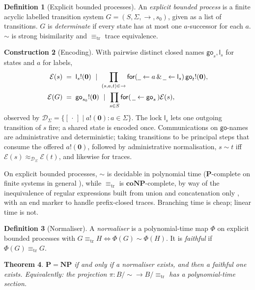 \documentclass[11pt]{article}
\theoremstyle{definition}
\newtheorem{definition}{Definition}[section]
\newtheorem{construction}[definition]{Construction}
\theoremstyle{plain}
\newtheorem{theorem}[definition]{Theorem}
\theoremstyle{remark}
\newcommand{\inp}[3]{\mathsf{for}(\,#1 \leftarrow #2\,)#3}
\newcommand{\out}[2]{#1!(#2)}
\newcommand{\nil}{\mathbf{0}}
\newcommand{\Obs}{\mathcal{D}}
\newcommand{\bisim}{\approx}
\newcommand{\sbisim}{\sim}
\newcommand{\treq}{\equiv_{\mathrm{tr}}}
\newcommand{\wild}{\mathord{\underline{\hspace{0.5em}}}}
\newcommand{\hole}{[\,\cdot\,]}
\newcommand{\go}{\mathsf{go}}
\newcommand{\lk}{\mathsf{l}}
\newcommand{\Pclass}{\mathbf{P}}
\newcommand{\NPclass}{\mathbf{NP}}
\newcommand{\coNP}{\mathbf{coNP}}
\begin{document}
\begin{definition}[Explicit bounded processes]
An \emph{explicit bounded process} is a finite acyclic labelled
transition system $G = (S, \Sigma, \to, s_0)$, given as a list of
transitions. $G$ is \emph{determinate} if every state has at most one
$a$-successor for each $a$. $\sbisim$ is strong bisimilarity and $\treq$
trace equivalence.
\end{definition}

\begin{construction}[Encoding]\label{con:encoding}
With pairwise distinct closed names $\go_s, \lk_s$ for states and $a$
for labels,
\[
\begin{aligned}
\mathcal{E}(s) &\;=\; \out{\lk_s}{\nil}
  \ \mid\ \prod_{(s,a,t) \in \to}
     \mathsf{for}(\wild \leftarrow a \,\&\, \wild \leftarrow \lk_s)\,
     \out{\go_t}{\nil},\\
\mathcal{E}(G) &\;=\; \out{\go_{s_0}}{\nil}
  \ \mid\ \prod_{s \in S} \inp{\wild}{\go_s}{\mathcal{E}(s)},
\end{aligned}
\]
observed by $\Obs_\Sigma = \{\hole \mid \out{a}{\nil} : a \in \Sigma\}$.
The lock $\lk_s$ lets one outgoing transition of $s$ fire; a shared state
is encoded once. Communications on $\go$-names are administrative and
deterministic; taking transitions to be principal steps that consume the
offered $\out{a}{\nil}$, followed by
administrative normalisation, $s \sbisim t$ iff $\mathcal{E}(s)
\bisim_{\Obs_\Sigma} \mathcal{E}(t)$, and likewise for traces.
\end{construction}

On explicit bounded processes, $\sbisim$ is decidable in polynomial time
\cite{PaigeTarjan87} ($\Pclass$-complete on finite systems in general
\cite{BGS92}), while $\treq$ is $\coNP$-complete, by way of the
inequivalence of regular expressions built from union and concatenation
only \cite{StockmeyerMeyer73}, with an end marker to handle prefix-closed
traces.
Branching time is cheap; linear time is not.

\begin{definition}[Normaliser]
A \emph{normaliser} is a polynomial-time map $\Phi$ on explicit bounded
processes with $G \treq H \iff \Phi(G) \sbisim \Phi(H)$. It is
\emph{faithful} if $\Phi(G) \treq G$.
\end{definition}

\begin{theorem}\label{thm:normaliser}
$\Pclass = \NPclass$ if and only if a normaliser exists, and then a
faithful one exists. Equivalently: the projection $\pi : B/{\sbisim} \to
B/{\treq}$ has a polynomial-time section.
\end{theorem}
\end{document}
